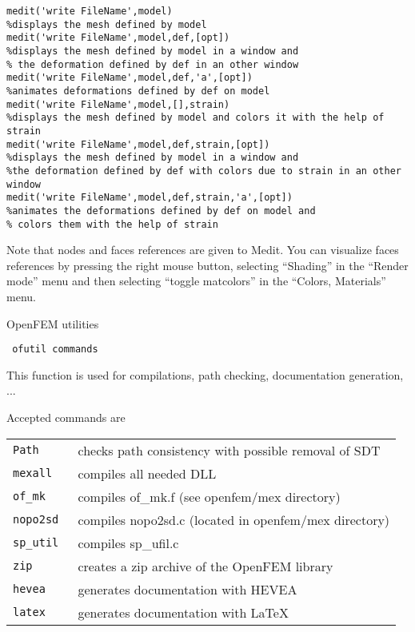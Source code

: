 \begin{verbatim}
medit('write FileName',model)
%displays the mesh defined by model
medit('write FileName',model,def,[opt])
%displays the mesh defined by model in a window and
% the deformation defined by def in an other window
medit('write FileName',model,def,'a',[opt])
%animates deformations defined by def on model
medit('write FileName',model,[],strain)
%displays the mesh defined by model and colors it with the help of strain
medit('write FileName',model,def,strain,[opt])
%displays the mesh defined by model in a window and 
%the deformation defined by def with colors due to strain in an other window
medit('write FileName',model,def,strain,'a',[opt])
%animates the deformations defined by def on model and
% colors them with the help of strain
\end{verbatim}

Note that nodes and faces references are given to Medit. You can visualize faces references by pressing the right mouse button, selecting ``Shading'' in the ``Render mode'' menu and then selecting ``toggle matcolors'' in the ``Colors, Materials'' menu.





OpenFEM utilities

\rsyntax\begin{verbatim}
 ofutil commands
\end{verbatim}\nlvs


This function is used for compilations, path checking, documentation generation, ...

 Accepted commands are
 
\lvs\begin{tabular}{@{}p{}@{}p{}@{}}
{\tt   Path     } & checks path consistency with possible removal of SDT\\
{\tt   mexall   } & compiles all needed DLL\\
{\tt   of\_mk    } & compiles of\_mk.f (see openfem/mex directory)\\
{\tt   nopo2sd  } & compiles nopo2sd.c (located in openfem/mex directory)\\
{\tt   sp\_util  } & compiles sp\_ufil.c\\
{\tt   zip      } & creates a zip archive of the OpenFEM library \\
{\tt   hevea    } & generates documentation with HEVEA\\
{\tt   latex    } & generates documentation with LaTeX\\
%
\end{tabular}
 
